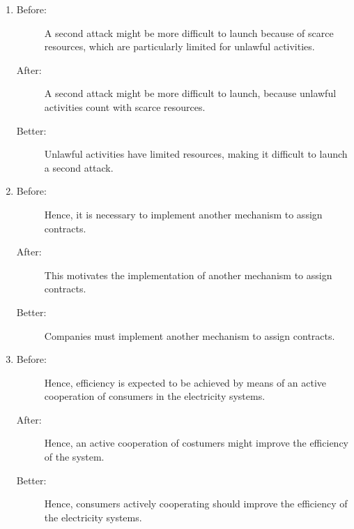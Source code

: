 \documentclass[a4paper,10pt]{article}
\newcommand{\BDTBlue}[1]{{\color{blue}#1}}
\newcommand{\BDTPurple}[1]{{\color{violet}#1}}
\newcommand{\BDTGreen}[1]{{\color{green}#1}}
\newcommand{\BDTBrown}[1]{{\color{brown!80!red}#1}}
\begin{document}
\begin{enumerate}
 \item 
\begin{description}
 \item[Before:] A second attack might \BDTGreen{be} more difficult \BDTPurple{to} launch because \BDTPurple{of} scarce resources, \BDTBlue{which} \BDTGreen{are} \BDTBrown{particularly} \BDTGreen{limited} \BDTPurple{for} unlawful activities. 
 
 \item[After:] A second attack might \BDTGreen{be} more difficult \BDTPurple{to} launch, because unlawful activities count \BDTPurple{with} scarce resources.
 
 \item[Better:] Unlawful activities \BDTGreen{have} \BDTGreen{limited} resources, \BDTGreen{making} \BDTBlue{it} difficult \BDTPurple{to} launch a second attack.
\end{description}


\item
\begin{description}
 \item[Before:] \BDTGreen{Hence,} \BDTBlue{it} \BDTGreen{is} necessary \BDTPurple{to} \BDTGreen{implement} another mechanism \BDTPurple{to} assign contracts.
 
 \item[After:] This motivates the \BDTGreen{implementation} \BDTPurple{of} another mechanism \BDTPurple{to} assign contracts.
 
 \item[Better:] Companies must \BDTGreen{implement} another mechanism \BDTPurple{to} assign contracts.
\end{description}


\item
\begin{description}
 \item[Before:]  \BDTGreen{Hence,} efficiency \BDTGreen{is} \BDTGreen{expected} \BDTPurple{to} \BDTGreen{be} \BDTGreen{achieved} \BDTPurple{by} means \BDTPurple{of} an active
\BDTGreen{cooperation} \BDTPurple{of} consumers \BDTPurple{in} the electricity systems.
 
 \item[After:] \BDTGreen{Hence,} an active \BDTGreen{cooperation} \BDTPurple{of} costumers might improve the efficiency \BDTPurple{of} the system.
 
 \item[Better:] \BDTGreen{Hence,} consumers \BDTBrown{actively} cooperating should improve the efficiency \BDTPurple{of} the electricity systems.
\end{description}



\end{enumerate}
\end{document}
